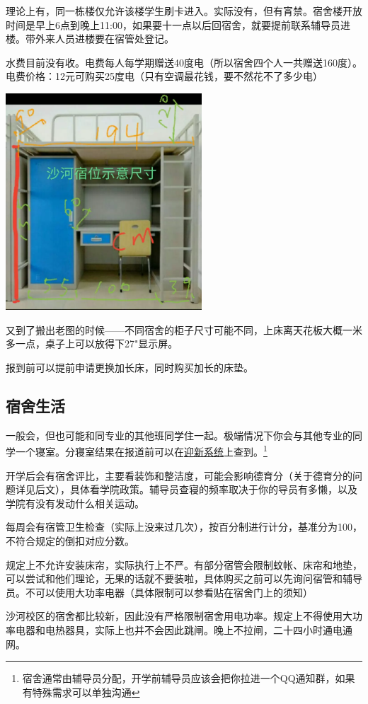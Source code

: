 
理论上有，同一栋楼仅允许该楼学生刷卡进入。实际没有，但有宵禁。宿舍楼开放时间是早上6点到晚上11:00，如果要十一点以后回宿舍，就要提前联系辅导员进楼。带外来人员进楼要在宿管处登记。


水费目前没有收。电费每人每学期赠送40度电（所以宿舍四个人一共赠送160度）。电费价格：12元可购买25度电（只有空调最花钱，要不然花不了多少电）


\begin{center}
    \includegraphics[width=0.55\textwidth]{images/bed-size.png}
\end{center}

又到了搬出老图的时候——不同宿舍的柜子尺寸可能不同，上床离天花板大概一米多一点，桌子上可以放得下27"显示屏。


报到前可以提前申请更换加长床，同时购买加长的床垫。

\subsection{宿舍生活}


一般会，但也可能和同专业的其他班同学住一起。极端情况下你会与其他专业的同学一个寝室。分寝室结果在报道前可以在\href{https://welcome.bupt.edu.cn/}{迎新系统}上查到。\footnote{宿舍通常由辅导员分配，开学前辅导员应该会把你拉进一个QQ通知群，如果有特殊需求可以单独沟通}


开学后会有宿舍评比，主要看装饰和整洁度，可能会影响德育分（关于德育分的问题详见后文），具体看学院政策。辅导员查寝的频率取决于你的导员有多懒，以及学院有没有发动什么相关运动。

每周会有宿管卫生检查（实际上没来过几次），按百分制进行计分，基准分为100，不符合规定的倒扣对应分数。


规定上不允许安装床帘，实际执行上不严。有部分宿管会限制蚊帐、床帘和地垫，可以尝试和他们理论，无果的话就不要装啦，具体购买之前可以先询问宿管和辅导员。不可以使用大功率电器（具体限制可以参看贴在宿舍门上的须知）

沙河校区的宿舍都比较新，因此没有严格限制宿舍用电功率。规定上不得使用大功率电器和电热器具，实际上也并不会因此跳闸。晚上不拉闸，二十四小时通电通网。
